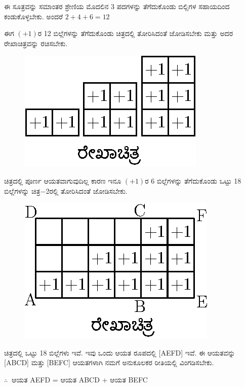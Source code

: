 ಈ ಸೂತ್ರವನ್ನು ಸಮಾಂತರ ಶ್ರೇಣಿಯ ಮೊದಲಿನ 3 ಪದಗಳನ್ನು ತೆಗೆದುಕೊಂಡು ಬಿಲ್ಲಿಗಳ ಸಹಾಯದಿಂದ ಕಂಡುಕೊಳ್ಳಬೇಕು. ಅಂದರೆ $2 + 4 + 6 = 12$

\smallskip

ಈಗ $(+1)$ರ 12 ಬಿಲ್ಲೆಗಳನ್ನು ತೆಗೆದುಕೊಂಡು ಚಿತ್ರದಲ್ಲಿ ತೋರಿಸಿದಂತೆ ಜೋಡಿಸ\-ಬೇಕು ಮತ್ತು ಅದರ ರೇಖಾಚಿತ್ರವನ್ನು ರಚಿಸಬೇಕು.
\begin{figure}[H]
\centering
\includegraphics{src/figure/chap3/fig3-56a.eps}
\end{figure}

ಚಿತ್ರದಲ್ಲಿ ಪೂರ್ಣ ಆಯತವಾಗುವುದಿಲ್ಲ ಕಾರಣ ಇನೂ $(+1)$ರ 6 ಬಿಲ್ಲೆಗಳನ್ನು ತೆಗೆದುಕೊಂಡು ಒಟ್ಟು 18 ಬಿಲ್ಲೆಗಳನ್ನು ಚಿತ್ರ$-$2ರಲ್ಲಿ ತೋರಿಸಿದಂತೆ ಜೋಡಿಸಬೇಕು. 
\begin{figure}[H]
\centering
\includegraphics{src/figure/chap3/fig3-56b.eps}
\end{figure}

ಚಿತ್ರದಲ್ಲಿ ಒಟ್ಟು 18 ಬಿಲ್ಲೆಗಳು ಇವೆ. ಇವು ಒಂದು ಆಯತ ರೂಪದಲ್ಲಿ [AEFD] ಇವೆ. ಈ ಆಯತವನ್ನು [ABCD] ಮತ್ತು [BEFC] ಆಯತಗಳಾಗಿ ನಮಗೆ ಅನುಕೂಲಕರ ರೀತಿಯಲ್ಲಿ ವಿಂಗಡಿಸಬೇಕು. 

$\therefore~$ ಆಯತ AEFD = ಆಯತ ABCD + ಆಯತ BEFC

